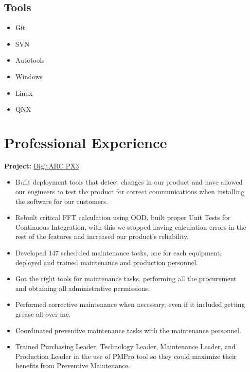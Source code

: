 \documentclass{scrartcl}
\begin{document}
\begin{minipage}[t]{0.28\textwidth}
\begin{flushright}
	
	\section*{Tools}
		\begin{itemize}[noitemsep]
			\item Git
			\item SVN
			\item Autotools
			\item Windows
			\item Linux 
			\item QNX
		\end{itemize}
	\end{flushright}
\end{minipage}

\pagebreak
\section*{Professional Experience}


\textbf{Project:} \href{http://amige.com/meltshops_technological_controls_digitarc_px3.html}{DigitARC PX3}
	\begin{itemize}[noitemsep]
		\item Built deployment tools that detect changes in our product and have allowed our engineers to test the product for correct communications when installing the software for our customers.
		\item Rebuilt critical FFT calculation using OOD, built proper Unit Tests for Continuous Integration, with this we stopped having calculation errors in the rest of the features and increased our product's reliability. 
	\end{itemize}


\begin{itemize}[noitemsep]
	\item Developed 147 scheduled maintenance tasks, one for each equipment, deployed and trained maintenance and production personnel.  
	\item Got the right tools for maintenance tasks, performing all the procurement and obtaining all administrative permissions.
	\item Performed corrective maintenance when necessary, even if it included getting grease all over me. 
	\item Coordinated preventive maintenance tasks with the maintenance personnel.
	\item Trained Purchasing Leader, Technology Leader, Maintenance Leader, and Production Leader in the use of PMPro tool so they could maximize their benefits from Preventive Maintenance.  
\end{itemize}
\end{document}
